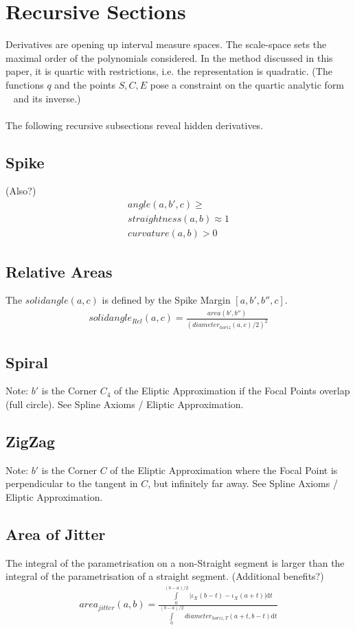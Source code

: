 \documentclass{report}
\begin{document}
\section{Recursive Sections}
Derivatives are opening up interval measure spaces. The scale-space sets the maximal order of the polynomials considered. In the method discussed in this paper, it is quartic with restrictions, i.e. the representation is quadratic.  (The functions $q$ and the points $S,C,E$ pose a constraint on the quartic analytic form ~\cite[Spline\_CharacteristicPolynomials.nb]{Stopeight} and its inverse.)\\\\
The following recursive subsections reveal hidden derivatives.

\subsection{Spike}
(Also?)
\begin{align}
angle(a,b',c)\geq\\
straightness(a,b)\approx 1\\
curvature(a,b)>0
\end{align}

\subsection{Relative Areas}
The $solidangle(a,c)$ is defined by the Spike Margin $[a,b',b'',c]$.
\begin{align}
solidangle_{Rel}(a,c) = \frac{area(b',b'')}{(diameter_{horiz}(a,c)/2)^2}
\end{align}

\subsection{Spiral}
Note: $b'$ is the Corner $C_{4}$ of the Eliptic Approximation if the Focal Points overlap (full circle). See Spline Axioms / Eliptic Approximation.

\subsection{ZigZag}
Note: $b'$ is the Corner $C$ of the Eliptic Approximation where the Focal Point is perpendicular to the tangent in $C$, but infinitely far away. See Spline Axioms / Eliptic Approximation.

\subsection{Area of Jitter}
The integral of the parametrisation on a non-Straight segment is larger than the integral of the parametrisation of a straight segment. (Additional benefits?)
\begin{align}
area_{jitter}(a,b)=\frac{\int \limits _{0}^{(b-a)/2} \lvert \iota_{X}(b-t)-\iota_{X}(a+t)\rvert \mathrm{d}t}{\int \limits _{0}^{(b-a)/2} diameter_{horiz,T}(a+t,b-t)\mathrm{d}t}
\end{align}
\end{document}
